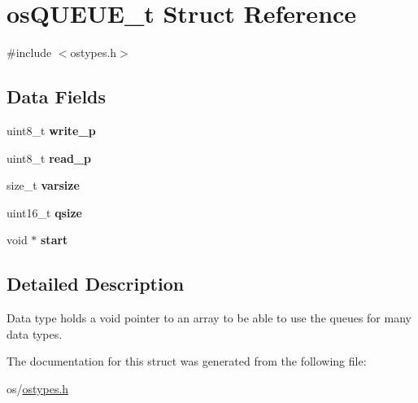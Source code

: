 \hypertarget{structos_q_u_e_u_e__t}{}\section{os\+Q\+U\+E\+U\+E\+\_\+t Struct Reference}
\label{structos_q_u_e_u_e__t}


{\ttfamily \#include $<$ostypes.\+h$>$}

\subsection*{Data Fields}
\begin{DoxyCompactItemize}
\item 
\mbox{\label{structos_q_u_e_u_e__t_a418b6d1612eff43ba60ed8014917d7b1}} 
uint8\+\_\+t {\bfseries write\+\_\+p}
\item 
\mbox{\label{structos_q_u_e_u_e__t_a5c0e2590217d519484e519a510f4ff23}} 
uint8\+\_\+t {\bfseries read\+\_\+p}
\item 
\mbox{\label{structos_q_u_e_u_e__t_a83564fccea0d26714ccba07901241089}} 
size\+\_\+t {\bfseries varsize}
\item 
\mbox{\label{structos_q_u_e_u_e__t_a26e55a22aa50bdfb7c20f344c19d4dd5}} 
uint16\+\_\+t {\bfseries qsize}
\item 
\mbox{\label{structos_q_u_e_u_e__t_a53255b934b07b472175fbb8e847f9b5d}} 
void $\ast$ {\bfseries start}
\end{DoxyCompactItemize}


\subsection{Detailed Description}
Data type holds a void pointer to an array to be able to use the queues for many data types. 

The documentation for this struct was generated from the following file\+:\begin{DoxyCompactItemize}
\item 
os/\hyperlink{ostypes_8h}{ostypes.\+h}\end{DoxyCompactItemize}
